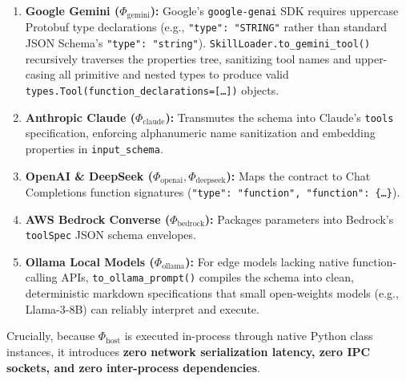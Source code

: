 \begin{enumerate}[leftmargin=*]
  \item \textbf{Google Gemini ($\Phi_{\text{gemini}}$):} Google's \texttt{google-genai} SDK requires uppercase Protobuf type declarations (e.g., \texttt{"type": "STRING"} rather than standard JSON Schema's \texttt{"type": "string"}). \texttt{SkillLoader.\allowbreak to\_gemini\_tool()} recursively traverses the properties tree, sanitizing tool names and upper-casing all primitive and nested types to produce valid \texttt{types.Tool(function\_declarations=[\dots])} objects.
  \item \textbf{Anthropic Claude ($\Phi_{\text{claude}}$):} Transmutes the schema into Claude's \texttt{tools} specification, enforcing alphanumeric name sanitization and embedding properties in \texttt{input\_schema}.
  \item \textbf{OpenAI \& DeepSeek ($\Phi_{\text{openai}}, \Phi_{\text{deepseek}}$):} Maps the contract to Chat Completions function signatures (\texttt{"type": "function", "function": \{\dots\}}).
  \item \textbf{AWS Bedrock Converse ($\Phi_{\text{bedrock}}$):} Packages parameters into Bedrock's \texttt{toolSpec} JSON schema envelopes.
  \item \textbf{Ollama Local Models ($\Phi_{\text{ollama}}$):} For edge models lacking native function-calling APIs, \texttt{to\_ollama\_prompt()} compiles the schema into clean, deterministic markdown specifications that small open-weights models (e.g., Llama-3-8B) can reliably interpret and execute.
\end{enumerate}

Crucially, because $\Phi_{\text{host}}$ is executed in-process through native Python class instances, it introduces \textbf{zero network serialization latency, zero IPC sockets, and zero inter-process dependencies}.
